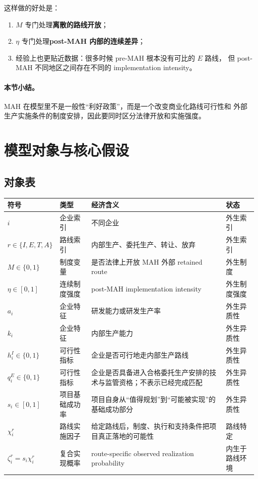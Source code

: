 \documentclass[12pt,UTF8]{ctexart}
\theoremstyle{plain}
\theoremstyle{remark}
\begin{document}
这样做的好处是：

\begin{enumerate}[leftmargin=2em]
    \item $M$ 专门处理\textbf{离散的路线开放}；
    \item $\eta$ 专门处理\textbf{post-MAH 内部的连续差异}；
    \item 经验上也更贴近数据：很多时候 pre-MAH 根本没有可比的 $E$ 路线，
    但 post-MAH 不同地区之间存在不同的 implementation intensity。
\end{enumerate}

\paragraph{本节小结。}
MAH 在模型里不是一般性“利好政策”，而是一个改变商业化路线可行性和
外部生产实施条件的制度安排，因此要同时区分法律开放和实施强度。

\section{模型对象与核心假设}

\subsection{对象表}

\begingroup
\small
\renewcommand{\arraystretch}{1.14}
\noindent\begin{tabularx}{\textwidth}{p{} p{} X p{}}
\toprule
符号 & 类型 & 经济含义 & 状态 \\
\midrule
$i$ & 企业索引 & 不同企业 & 外生索引 \\
$r\in\{I,E,T,A\}$ & 路线索引 & 内部生产、委托生产、转让、放弃 & 外生索引 \\
$M\in\{0,1\}$ & 制度变量 & 是否法律上开放 MAH 外部 retained route & 外生制度 \\
$\eta\in[0,1]$ & 连续制度强度 & post-MAH implementation intensity & 外生制度强度 \\
$a_i$ & 企业特征 & 研发能力或研发生产率 & 外生异质性 \\
$k_i$ & 企业特征 & 内部生产能力 & 外生异质性 \\
$h_i^I\in\{0,1\}$ & 可行性指标 & 企业是否可行地走内部生产路线 & 外生异质性 \\
$q_i^E\in\{0,1\}$ & 可行性指标 & 企业是否具备进入合格委托生产安排的技术与监管资格；不表示已经完成匹配 & 外生异质性 \\
$s_i\in[0,1]$ & 项目基础成功率 & 项目自身从“值得规划”到“可能被实现”的基础成功部分 & 外生异质性 \\
$\chi_i^r$ & 路线实施因子 & 给定路线后，制度、执行和支持条件把项目真正落地的可能性 & 路线特定 \\
$\zeta_i^r=s_i\chi_i^r$ & 复合实现概率 & route-specific observed realization probability & 内生于路线环境 \\
\bottomrule
\end{tabularx}
\end{document}
